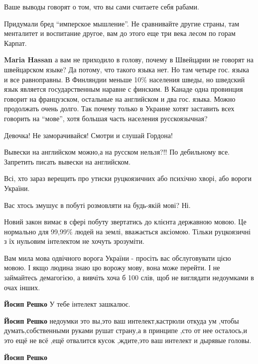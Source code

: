 \begin{itemize}
\begin{itemize}
Ваше выводы говорят о том, что вы сами считаете себя рабами.

Придумали бред \enquote{имперское мышление}. Не сравнивайте другие страны, там
менталитет и воспитание другое, вам до этого еще три века лесом по горам
Карпат.


\textbf{Maria Hassan} а вам не приходило в голову, почему в Швейцарии не
говорят на швейцарском языке? Да потому, что такого языка нет. Но там четыре
гос. языка и все равноправны. В Финляндии меньше 10\% населения шведы, но
шведский язык является государственным наравне с финским. В Канаде одна
провинция говорит на французском, остальные на английском и два гос. языка.
Можно продолжать очень долго. Так почему только в Украине хотят заставить всех
говорить на \enquote{мове}, хотя большая часть населения русскоязычная?
\end{itemize}

Девочка! Не заморачивайся! Смотри и слушай Гордона!

Вывески на английском можно,а на русском нельзя?!! По дебильному все. Запретить писать вывески на английском.


Всі, хто зараз верещить про утиски руцкоязичних або психічно хворі, або вороги України.

Вас хтось змушує в побуті розмовляти на будь-якій мові?
Ні.

Новий закон вимає в сфері побуту звертатись до клієнта державною мовою. Це
нормально для 99,99\% людей на землі, вважається аксіомою. Тільки руцкоязичні з
їх нульовим інтелектом не хочуть зрозуміти.

Вам мила мова одвічного ворога України - просіть вас обслуговувати цією мовою.
І якщо людина знаю цю ворожу мову, вона може перейти.
І не займайтесь демагогією, а вивчіть хоча б 100 слів, щоб не виглядати
недоумками в очах інших.

\begin{itemize}

\textbf{Йосип Решко} У тебе інтелект зашкалює.


\textbf{Йосип Решко} недоумки это вы,это ваш интелект,кастрюли откуда ум ,чтобы
думать,собственными руками рушат страну,а в принципе ,сто от нее осталось,и это
ещё не всё ,ещё отвалится кусок ,ждите,это ваш интелект и дырявые головы.

\textbf{Йосип Решко}


\end{itemize}
\end{itemize}
